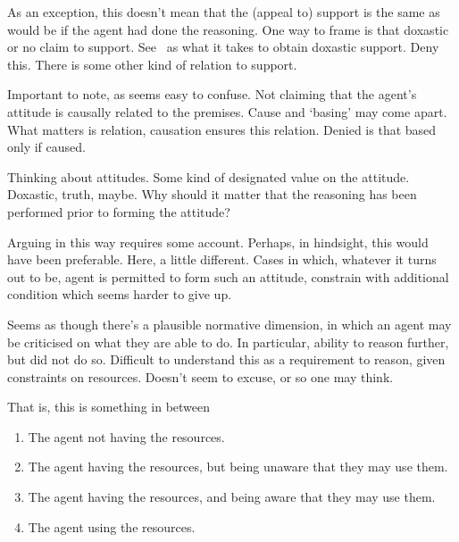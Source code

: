 \begin{note}
  As an exception, this doesn't mean that the (appeal to) support is the same as would be if the agent had done the reasoning.
  One way to frame is that doxastic or no claim to support.
  See~\uRa{} as what it takes to obtain doxastic support.
  Deny this.
  There is some other kind of relation to support.
\end{note}

\begin{note}[No causality]
  Important to note, as seems easy to confuse.
  Not claiming that the agent's attitude is causally related to the premises.
  Cause and `basing' may come apart.
  What matters is relation, causation ensures this relation.
  Denied is that based only if caused.
\end{note}

\begin{note}
  Thinking about attitudes.
  Some kind of designated value on the attitude.
  Doxastic, truth, maybe.
  Why should it matter that the reasoning has been performed prior to forming the attitude?

  Arguing in this way requires some account.
  Perhaps, in hindsight, this would have been preferable.
  Here, a little different.
  Cases in which, whatever it turns out to be, agent is permitted to form such an attitude, constrain with additional condition which seems harder to give up.
\end{note}

\begin{note}
  Seems as though there's a plausible normative dimension, in which an agent may be criticised on what they are able to do.
  In particular, ability to reason further, but did not do so.
  Difficult to understand this as a requirement to reason, given constraints on resources.
  Doesn't seem to excuse, or so one may think.

  That is, this is something in between
  \begin{enumerate}
  \item The agent not having the resources.
  \item The agent having the resources, but being unaware that they may use them.
  \item The agent having the resources, and being aware that they may use them.
  \item The agent using the resources.
  \end{enumerate}
\end{note}

